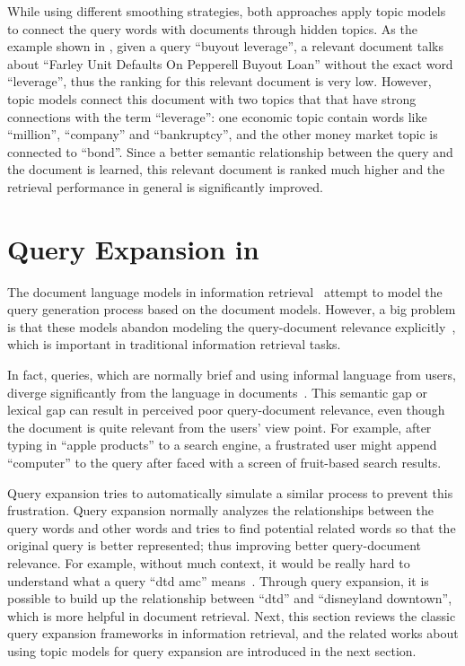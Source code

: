 While using different smoothing strategies, both approaches apply topic models to
connect the query words with documents through hidden topics. As the example shown in
\citet{wei-06}, given a query ``buyout leverage'', a relevant document talks about 
``Farley Unit Defaults On Pepperell Buyout Loan'' without the exact word ``leverage'',
thus the ranking for this relevant document is very low. However, topic models connect
this document with two topics that that have strong connections with the term ``leverage'': 
one economic topic contain words like ``million'', ``company'' and ``bankruptcy'',
and the other money market topic is connected to ``bond''.
Since a better semantic relationship between the query and the document is learned,
this relevant document is ranked much higher and the retrieval performance in general is 
significantly improved.


\section{Query Expansion in }

The document language models in information
retrieval~\citep{PonteCroft} attempt to model the query
generation process based on the document models. However, a big
problem is that these models abandon modeling the query-document
relevance explicitly~\citep{Lavrenko-2001}, which is important in
traditional information retrieval tasks.

In fact, queries, which are normally brief and using informal
language from users, diverge significantly from the language in
documents~\citep{Muller-2009}. This semantic gap or lexical gap can
result in perceived poor query-document relevance, even though the document is
quite relevant from the users' view point. For example, after typing
in ``apple products'' to a search engine, a frustrated user might append
``computer'' to the query after faced with a screen of fruit-based
search results.

Query expansion tries to automatically simulate a similar process to
prevent this frustration. Query expansion normally analyzes the
relationships between the query words and other words and tries to
find potential related words so that the original query is better
represented; thus improving better query-document relevance. For
example, without much context, it would be really hard to understand
what a query ``dtd amc'' means~\citep{Jiang-2016}. Through query
expansion, it is possible to build up the relationship between ``dtd''
and ``disneyland downtown'', which is more helpful in document
retrieval.  Next, this section reviews the classic query expansion
frameworks in information retrieval, and the related works about using
topic models for query expansion are introduced in the next section.

